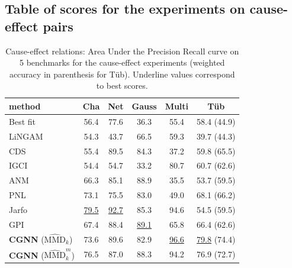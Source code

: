 \documentclass[a4paper, 11pt]{article}
\begin{document}
\newpage

\subsection{Table of scores for the experiments on cause-effect pairs}


\begin{table}[h!]
  \footnotesize
  \caption{Cause-effect relations: Area Under the Precision Recall curve on 5 benchmarks for the cause-effect experiments (weighted accuracy in parenthesis for T\"ub). Underline values correspond to best scores.}
  \label{table:pairwise}
  \centering
  \begin{tabular}{lccccc} 
    \toprule
    method & {Cha}  & {Net} & {Gauss} & {Multi} & {T\"ub }\\
    \midrule
    Best fit & 56.4 & 77.6 & 36.3 & 55.4 & 58.4 (44.9) \\
    LiNGAM & 54.3 & 43.7 & 66.5 & 59.3 & 39.7 (44.3) \\
    CDS  & 55.4 & 89.5 & 84.3 & 37.2 & 59.8 (65.5) \\
    IGCI  & 54.4 & 54.7 & 33.2 & 80.7 & 60.7 (62.6) \\
    ANM  & 66.3 & 85.1 & 88.9 & 35.5 & 53.7 (59.5) \\
    PNL  & 73.1 & 75.5 & 83.0 & 49.0 & 68.1 (66.2) \\
    Jarfo  & \underline{79.5} & \underline{92.7} & 85.3 & 94.6 & 54.5 (59.5)  \\
    GPI  & 67.4 & 88.4 & \underline{89.1} & 65.8 & 66.4 (62.6) \\
    \midrule
    \textbf{CGNN} ($\widehat{\text{MMD}}_k$) & 73.6 & 89.6 & 82.9 & \underline{96.6} & \underline{79.8} (74.4)  \\
    \textbf{CGNN} ($\widehat{\text{MMD}}^m_k$) & 76.5 & 87.0 & 88.3 & 94.2 & 76.9 (72.7) \\
    \bottomrule
  \end{tabular}
  \label{TableResultsPairwise}
\end{table}
\end{document}

